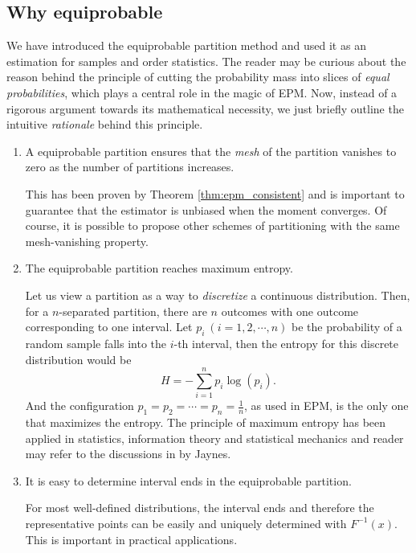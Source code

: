 \subsection{Why equiprobable}
We have introduced the equiprobable partition method and used it as an estimation for samples and order statistics. The reader may be curious about the reason behind the principle of cutting the probability mass into slices of \textit{equal probabilities}, which plays a central role in the magic of EPM. Now, instead of a rigorous argument towards its mathematical necessity, we just briefly outline the intuitive \textit{rationale} behind this principle. 

\begin{enumerate}
\item A equiprobable partition ensures that the \textit{mesh} of the partition vanishes to zero as the number of partitions increases. 

This has been proven by Theorem \ref{thm:epm_consistent} and is important to guarantee that the estimator is unbiased when the moment converges. Of course, it is possible to propose other schemes of partitioning with the same mesh-vanishing property. 

\item The equiprobable partition reaches maximum entropy. 

Let us view a partition as a way to \textit{discretize} a continuous distribution. Then, for a $ n $-separated partition, there are $ n $ outcomes with one outcome corresponding to one interval. Let $ p_i \ (i=1,2, \cdots, n)$ be the probability of a random sample falls into the $ i $-th interval, then the entropy for this discrete distribution would be 
\begin{equation}
H = -\sum_{i=1}^{n} p_i \log(p_i).
\end{equation}
And the configuration $ p_1 = p_2 = \cdots = p_n = \frac{1}{n} $, as used in EPM, is the only one that maximizes the entropy. The principle of maximum entropy has been applied in statistics, information theory and statistical mechanics and reader may refer to the discussions in \cite{jaynes1957information,jaynes1957information2,jaynes1988relation} by Jaynes.

\item It is easy to determine interval ends in the equiprobable partition. 

For most well-defined distributions, the interval ends and therefore the representative points can be easily and uniquely determined with $ F^{-1}(x) $. This is important in practical applications. 

\end{enumerate}






